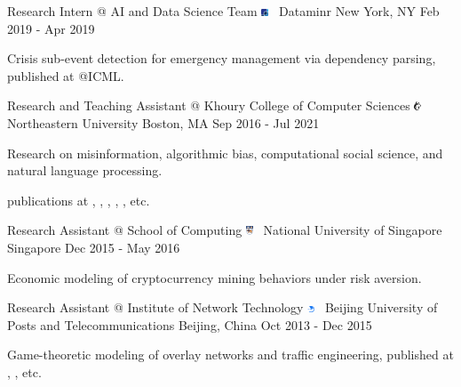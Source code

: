 \documentclass[letterpaper]{awesome-cv}
\begin{document}
\begin{cventries}
{\begin{cvitems}
      \end{cvitems}
    }
  \cventry
    {Research Intern @ AI and Data Science Team}
    {\includegraphics[width=0.016\textwidth]{../images/logos/dataminr.png}~ Dataminr}
    {New York, NY}
    {Feb 2019 - Apr 2019}
    {
      \begin{cvitems}
        \item {Crisis sub-event detection for emergency management via dependency parsing, published at @ICML.}
      \end{cvitems}
    }
  \cventry
    {Research and Teaching Assistant @ Khoury College of Computer Sciences}
    {\includegraphics[width=0.016\textwidth]{../images/logos/northeastern.png}~ Northeastern University}
    {Boston, MA}
    {Sep 2016 - Jul 2021}
    {
      \begin{cvitems}
        \item {Research on misinformation, algorithmic bias, computational social science, and natural language processing.}
        \item { publications at , , , , , etc.}
      \end{cvitems}
    }
  \cventry
    {Research Assistant @ School of Computing}
    {\includegraphics[width=0.016\textwidth]{../images/logos/nus.png}~ National University of Singapore}
    {Singapore}
    {Dec 2015 - May 2016}
    {
      \begin{cvitems}
        \item {Economic modeling of cryptocurrency mining behaviors under risk aversion.}
      \end{cvitems}
    }
  \cventry
    {Research Assistant @ Institute of Network Technology}
    {\includegraphics[width=0.016\textwidth]{../images/logos/bupt.png}~ Beijing University of Posts and Telecommunications}
    {Beijing, China}
    {Oct 2013 - Dec 2015}
    {
      \begin{cvitems}
        \item {Game-theoretic modeling of overlay networks and traffic engineering, published at , , etc.}
      \end{cvitems}
    }
\end{cventries}
\end{document}
